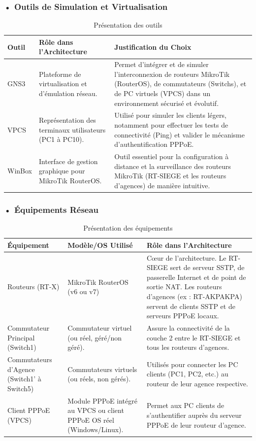 \subsubsection*{• Outils de Simulation et Virtualisation}
\begin{table}[H]
\centering
\caption{Présentation des outils}
\label{tab:outils}
\renewcommand{\arraystretch}{1.3}
\begin{tabular}{|p{3cm}|p{5cm}|p{7cm}|}
\hline
\textbf{Outil} & \textbf{Rôle dans l'Architecture} & \textbf{Justification du Choix} \\
\hline
\gls{GNS3} &
Plateforme de virtualisation et d'émulation réseau. &
Permet d'intégrer et de simuler l'interconnexion de routeurs MikroTik (\gls{RouterOS}), de commutateurs (Switchs), et de \gls{PC} virtuels (\gls{VPCS}) dans un environnement sécurisé et évolutif. \\
\hline
\gls{VPCS} &
Représentation des terminaux utilisateurs (\gls{PC}1 à \gls{PC}10). &
Utilisé pour simuler les clients légers, notamment pour effectuer les tests de connectivité (Ping) et valider le mécanisme d'authentification \gls{PPPoE}. \\
\hline
WinBox &
Interface de gestion graphique pour MikroTik \gls{RouterOS}. &
Outil essentiel pour la configuration à distance et la surveillance des routeurs MikroTik (RT-SIEGE et les routeurs d'agences) de manière intuitive. \\
\hline
\end{tabular}
\end{table}
\subsubsection*{• Équipements Réseau}

\begin{table}[H]
\centering
\caption{Présentation des équipements}
\label{tab:equipements}
\renewcommand{\arraystretch}{1.4}
\begin{tabular}{|p{4cm}|p{4cm}|p{6cm}|}
\hline
\textbf{Équipement} & \textbf{Modèle/OS Utilisé} & \textbf{Rôle dans l'Architecture} \\
\hline
Routeurs (RT-X) & MikroTik RouterOS (v6 ou v7) &
Cœur de l'architecture. Le RT-SIEGE sert de serveur \gls{SSTP}, de passerelle Internet et de point de sortie \gls{NAT}.
Les routeurs d'agences (ex : RT-AKPAKPA) servent de clients \gls{SSTP} et de serveurs \gls{PPPoE} locaux. \\
\hline
Commutateur Principal (Switch1) &
Commutateur virtuel (ou réel, géré/non géré). &
Assure la connectivité de la couche 2 entre le RT-SIEGE et tous les routeurs d'agences. \\
\hline
Commutateurs d'Agence (Switch1’ à Switch5) &
Commutateurs virtuels (ou réels, non gérés). &
Utilisés pour connecter les PC clients (\gls{PC}1, \gls{PC}2, etc.) au routeur de leur agence respective. \\
\hline
Client \gls{PPPoE} (\gls{VPCS}) &
Module \gls{PPPoE} intégré au \gls{VPCS} ou client \gls{PPPoE} \gls{OS} réel (Windows/Linux). &
Permet aux \gls{PC} clients de s'authentifier auprès du serveur \gls{PPPoE} de leur routeur d'agence. \\
\hline
\end{tabular}
\end{table}
